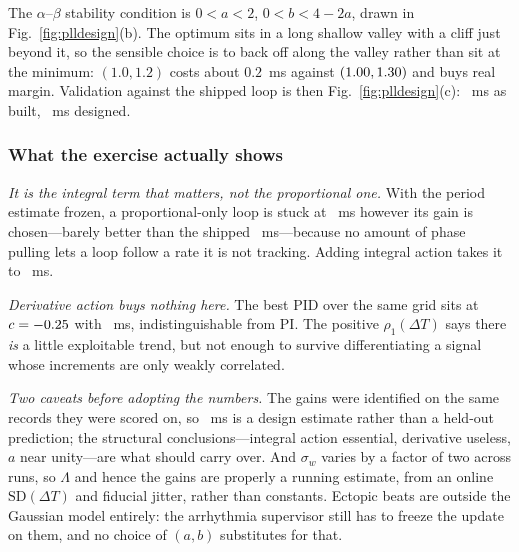 \documentclass[11pt]{article}
\begin{document}
The $\alpha$--$\beta$ stability condition is $0<a<2$, $0<b<4-2a$, drawn in
Fig.~\ref{fig:plldesign}(b). The optimum sits in a long shallow valley with a cliff just beyond it,
so the sensible choice is to back off along the valley rather than sit at the minimum: $(1.0,1.2)$
costs about $0.2$~ms against $(1.00{},1.30{})$ and buys real margin. Validation against the
shipped loop is then Fig.~\ref{fig:plldesign}(c): \pdBuilt{}~ms as built, \pdOptSd{}~ms designed.

\subsubsection*{What the exercise actually shows}

\emph{It is the integral term that matters, not the proportional one.} With the period estimate
frozen, a proportional-only loop is stuck at \pdPonly{}~ms however its gain is chosen---barely
better than the shipped \pdBuilt{}~ms---because no amount of phase pulling lets a loop follow a rate
it is not tracking. Adding integral action takes it to \pdOptSd{}~ms.

\emph{Derivative action buys nothing here.} The best PID over the same grid sits at
$c=-0.25{}$ with \pdPidSd{}~ms, indistinguishable from PI. The positive $\rho_1(\Delta T)$ says
there \emph{is} a little exploitable trend, but not enough to survive differentiating a signal whose
increments are only weakly correlated.

\emph{Two caveats before adopting the numbers.} The gains were identified on the same records they
were scored on, so \pdOptSd{}~ms is a design estimate rather than a held-out prediction; the
structural conclusions---integral action essential, derivative useless, $a$ near unity---are what
should carry over. And $\sigma_w$ varies by a factor of two across runs, so $\Lambda$ and hence the
gains are properly a running estimate, from an online $\mathrm{SD}(\Delta T)$ and fiducial jitter,
rather than constants. Ectopic beats are outside the Gaussian model entirely: the arrhythmia
supervisor still has to freeze the update on them, and no choice of $(a,b)$ substitutes for that.
\end{document}
